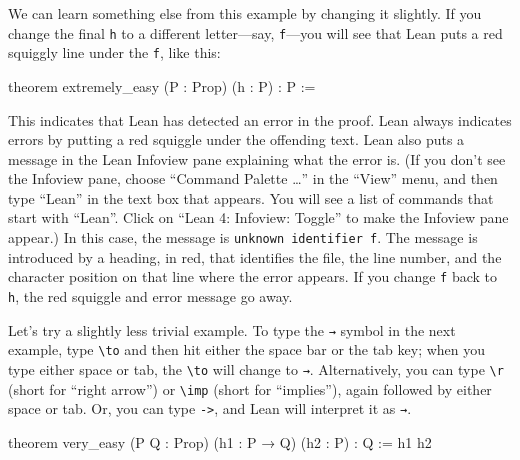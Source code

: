 \documentclass[
  letterpaper,
  DIV=11,
  numbers=noendperiod]{scrreprt}
\makeatletter
\newenvironment{Shaded}{\begin{snugshade}}{\end{snugshade}}
\newcommand{\ErrorTok}[1]{\textcolor[rgb]{0.68,0.00,0.00}{#1}}
\newcommand{\KeywordTok}[1]{\textcolor[rgb]{0.00,0.23,0.31}{#1}}
\newcommand{\NormalTok}[1]{\textcolor[rgb]{0.00,0.23,0.31}{#1}}
\newcommand{\SpecialCharTok}[1]{\textcolor[rgb]{0.37,0.37,0.37}{#1}}
\def\squiggly{\bgroup \markoverwith{\textcolor{red}{\lower3.5\p@\hbox{\sixly \char58}}}\ULon}
\renewcommand{\KeywordTok}[1]{\textcolor[HTML]{0000FF}{#1}}
\renewcommand{\SpecialCharTok}[1]{}
\renewcommand{\ErrorTok}[1]{\squiggly{#1}}
\newcommand{\excl}[1]{}
\makeatother
\begin{document}
We can learn something else from this example by changing it slightly.
If you change the final \texttt{h} to a different letter---say,
\texttt{f}---you will see that Lean puts a red squiggly line under the
\texttt{f}, like this:

\begin{Shaded}
\begin{Highlighting}[]
\KeywordTok{theorem}\NormalTok{ extremely\_easy (P : }\KeywordTok{Prop}\NormalTok{) (h : P) : P := }\SpecialCharTok{!!}\ErrorTok{f}\SpecialCharTok{!!}
\end{Highlighting}
\end{Shaded}

This indicates that Lean has detected an error in the proof. Lean always
indicates errors by putting a red squiggle under the offending text.
Lean also puts a message in the Lean Infoview pane explaining what the
error is. (If you don't see the Infoview pane, choose ``Command Palette
\ldots{}'' in the ``View'' menu, and then type ``Lean'' in the text box
that appears. You will see a list of commands that start with ``Lean''.
Click on ``Lean 4: Infoview: Toggle'' to make the Infoview pane appear.)
In this case, the message is
\texttt{unknown\ identifier\ \textquotesingle{}f\textquotesingle{}}. The
message is introduced by a heading, in red, that identifies the file,
the line number, and the character position on that line where the error
appears. If you change \texttt{f} back to \texttt{h}, the red squiggle
and error message go away.

Let's try a slightly less trivial example. To type the \texttt{→} symbol
in the next example, type \texttt{\textbackslash{}to} and then hit
either the space bar or the tab key; when you type either space or tab,
the \texttt{\textbackslash{}to} will change to \texttt{→}.
Alternatively, you can type \texttt{\textbackslash{}r} (short for
``right arrow'') or \texttt{\textbackslash{}imp} (short for
``implies''), again followed by either space or tab. Or, you can type
\excl{\texttt{-\textgreater{}}}\texttt{-\null>}, and Lean will interpret
it as \texttt{→}.

\begin{Shaded}
\begin{Highlighting}[]
\KeywordTok{theorem}\NormalTok{ very\_easy}
\NormalTok{(P Q : }\KeywordTok{Prop}\NormalTok{) (h1 : P → Q) (h2 : P) : Q := h1 h2}
\end{Highlighting}
\end{Shaded}
\end{document}
